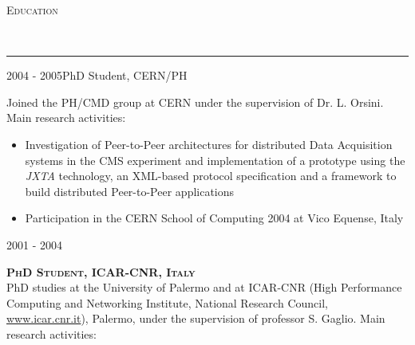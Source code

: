\documentclass[11pt]{article}
\renewcommand{\section}[2]%
        {\vspace{1.3\baselineskip}%
         \hspace{0in}%
         {\raggedright \scshape #1}\\[-0.15\baselineskip]%
                 \rule{\columnwidth}{1pt}%
        \vspace{.5\baselineskip}%
         \hspace{0in}
}
\renewcommand{\subsection}[2]%
        {
         {\bf{\raggedright \scshape #1}}{\bf{\hfill \scshape #2}}\\[-.7\baselineskip]
}
\newenvironment{CompactItemize} {
  \begin{itemize}
  \setlength{\itemsep}{-3pt}
  \setlength{\parsep}{0pt}
  \setlength{\topsep}{-2pt}
  \setlength{\partopsep}{-2pt}
} {\end{itemize}}
\begin{document}
%


\section{Education}

\subsection{2004 - 2005}{PhD Student, CERN/PH}

Joined the PH/CMD group at CERN under the supervision of Dr. L. Orsini. Main research activities:

\begin{CompactItemize}
\item Investigation of Peer-to-Peer architectures for distributed Data Acquisition systems in the
  CMS experiment and implementation of a prototype using the \emph{JXTA}
  technology, an XML-based protocol specification and a framework to build distributed
  Peer-to-Peer applications
\item Participation in the CERN School of Computing 2004 at Vico Equense, Italy
\end{CompactItemize}

\subsection{2001 - 2004}{PhD Student, ICAR-CNR, Italy}

PhD studies at the University of Palermo and at ICAR-CNR (High Performance Computing and Networking Institute,
National Research Council, \href{http://www.icar.cnr.it}{www.icar.cnr.it}), Palermo, under the supervision
of professor S. Gaglio. Main research activities:
\end{document}
